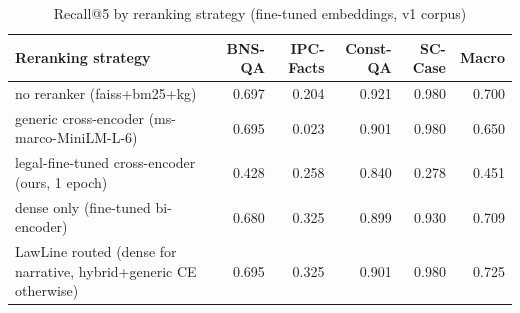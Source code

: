 \begin{table}
\caption{Recall@5 by reranking strategy (fine-tuned embeddings, v1 corpus)}
\label{tab:reranker}
\begin{tabular}{lrrrrr}
\toprule
Reranking strategy & BNS-QA & IPC-Facts & Const-QA & SC-Case & Macro \\
\midrule
no reranker (faiss+bm25+kg) & 0.697 & 0.204 & 0.921 & 0.980 & 0.700 \\
generic cross-encoder (ms-marco-MiniLM-L-6) & 0.695 & 0.023 & 0.901 & 0.980 & 0.650 \\
legal-fine-tuned cross-encoder (ours, 1 epoch) & 0.428 & 0.258 & 0.840 & 0.278 & 0.451 \\
dense only (fine-tuned bi-encoder) & 0.680 & 0.325 & 0.899 & 0.930 & 0.709 \\
LawLine routed (dense for narrative, hybrid+generic CE otherwise) & 0.695 & 0.325 & 0.901 & 0.980 & 0.725 \\
\bottomrule
\end{tabular}
\end{table}
